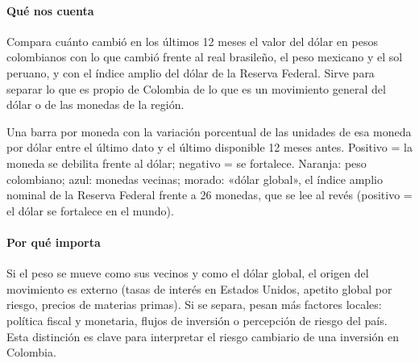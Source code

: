 \paragraph{Qué nos cuenta}
Compara cuánto cambió en los últimos 12 meses el valor del dólar en pesos colombianos con lo que cambió frente al real brasileño, el peso mexicano y el sol peruano, y con el índice amplio del dólar de la Reserva Federal. Sirve para separar lo que es propio de Colombia de lo que es un movimiento general del dólar o de las monedas de la región.

\begin{leer}
Una barra por moneda con la variación porcentual de las unidades de esa moneda por dólar entre el último dato y el último disponible 12 meses antes. Positivo = la moneda se debilita frente al dólar; negativo = se fortalece. Naranja: peso colombiano; azul: monedas vecinas; morado: «dólar global», el índice amplio nominal de la Reserva Federal frente a 26 monedas, que se lee al revés (positivo = el dólar se fortalece en el mundo).
\end{leer}

\paragraph{Por qué importa}
Si el peso se mueve como sus vecinos y como el dólar global, el origen del movimiento es externo (tasas de interés en Estados Unidos, apetito global por riesgo, precios de materias primas). Si se separa, pesan más factores locales: política fiscal y monetaria, flujos de inversión o percepción de riesgo del país. Esta distinción es clave para interpretar el riesgo cambiario de una inversión en Colombia.

